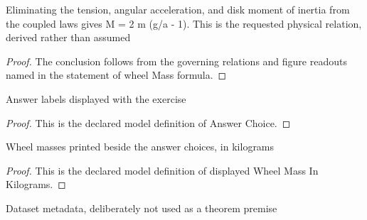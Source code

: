 \begin{lemma}
  \label{lem:physics:phyx-mini-0771:phyxminiproblems-problemphyxmini0771-wheelmass-formula}
  Eliminating the tension, angular acceleration, and disk moment of inertia from the coupled laws gives M = 2 m (g/a - 1). This is the requested physical relation, derived rather than assumed
\end{lemma}
\begin{proof}
  The conclusion follows from the governing relations and figure readouts named in the statement of wheel Mass formula.
\end{proof}
\begin{definition}
  \label{def:physics:phyx-mini-0771:phyxminiproblems-problemphyxmini0771-answerchoice}
  Answer labels displayed with the exercise
\end{definition}
\begin{proof}
  This is the declared model definition of Answer Choice.
\end{proof}
\begin{definition}
  \label{def:physics:phyx-mini-0771:phyxminiproblems-problemphyxmini0771-displayedwheelmassinkilograms}
  Wheel masses printed beside the answer choices, in kilograms
\end{definition}
\begin{proof}
  This is the declared model definition of displayed Wheel Mass In Kilograms.
\end{proof}
\begin{definition}
  \label{def:physics:phyx-mini-0771:phyxminiproblems-problemphyxmini0771-recordeddatasetanswer}
  Dataset metadata, deliberately not used as a theorem premise
\end{definition}
